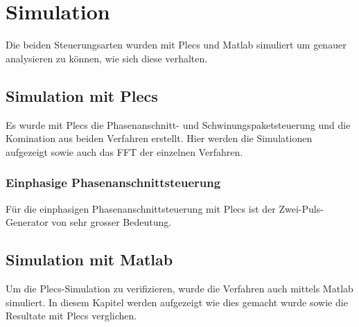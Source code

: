 \section{Simulation}
Die beiden Steuerungsarten wurden mit Plecs und Matlab simuliert um genauer analysieren zu können, wie sich diese verhalten. 

\subsection{Simulation mit Plecs}
Es wurde mit Plecs die Phasenanschnitt- und Schwinungspaketsteuerung und die Komination aus beiden Verfahren erstellt. Hier werden die Simulationen aufgezeigt sowie auch das FFT der einzelnen Verfahren.

\subsubsection{Einphasige Phasenanschnittsteuerung}
Für die einphasigen Phasenanschnittsteuerung mit Plecs ist der Zwei-Puls-Generator von sehr grosser Bedeutung. 



\subsection{Simulation mit Matlab}
Um die Plecs-Simulation zu verifizieren, wurde die Verfahren auch mittels Matlab simuliert. In diesem Kapitel werden aufgezeigt wie dies gemacht wurde sowie die Resultate mit Plecs verglichen. 